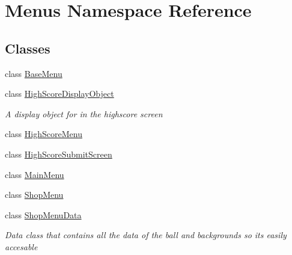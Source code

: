 \hypertarget{namespace_menus}{}\section{Menus Namespace Reference}
\label{namespace_menus}
\subsection*{Classes}
\begin{DoxyCompactItemize}
\item 
class \hyperlink{class_menus_1_1_base_menu}{Base\+Menu}
\item 
class \hyperlink{class_menus_1_1_high_score_display_object}{High\+Score\+Display\+Object}
\begin{DoxyCompactList}\small\item\em A display object for in the highscore screen \end{DoxyCompactList}\item 
class \hyperlink{class_menus_1_1_high_score_menu}{High\+Score\+Menu}
\item 
class \hyperlink{class_menus_1_1_high_score_submit_screen}{High\+Score\+Submit\+Screen}
\item 
class \hyperlink{class_menus_1_1_main_menu}{Main\+Menu}
\item 
class \hyperlink{class_menus_1_1_shop_menu}{Shop\+Menu}
\item 
class \hyperlink{class_menus_1_1_shop_menu_data}{Shop\+Menu\+Data}
\begin{DoxyCompactList}\small\item\em Data class that contains all the data of the ball and backgrounds so it\textquotesingle{}s easily accesable \end{DoxyCompactList}\end{DoxyCompactItemize}
